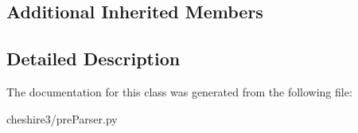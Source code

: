 \subsection*{Additional Inherited Members}


\subsection{Detailed Description}
 

The documentation for this class was generated from the following file\-:\begin{DoxyCompactItemize}
\item 
cheshire3/pre\-Parser.\-py\end{DoxyCompactItemize}
